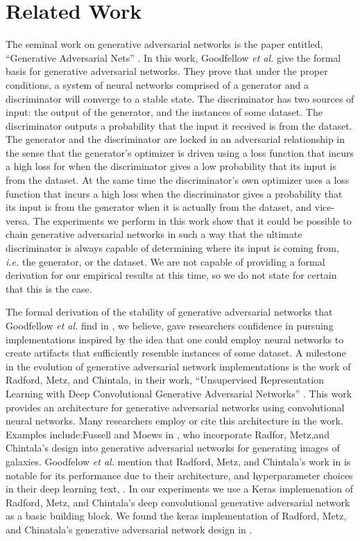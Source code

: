 \documentclass[conference]{IEEEtran}
\begin{document}
\section{Related Work}

The seminal work on generative adversarial networks is the paper entitled, 
``Generative Adversarial Nets'' \cite{gan}.  In this work, Goodfellow \textit{et
al.} give the formal basis for generative adversarial networks. They prove
that under the proper conditions, a system of neural networks comprised of a 
generator and a discriminator will converge to a stable state.  The
discriminator has two sources of input: the output of the generator, and the
instances of some dataset.  The discriminator outputs a probability that the
input it received is from the dataset.  The generator
and the discriminator are locked in an adversarial relationship in the sense
that the generator's optimizer is driven using a loss function that incurs a
high loss for when the discriminator gives a low probability that its input is
from the dataset.  At the same time the discriminator's own optimizer uses a
loss function that incurs a high loss when the discriminator gives a probability 
that its input is from the generator when it is actually from the dataset, and
vice-versa.  The experiments we perform in this work show that it could be
possible to chain generative adversarial networks in such a way that the
ultimate discriminator is always capable of determining where its input is
coming from, \textit{i.e.} the generator, or the dataset.  We are not capable of
providing a formal derivation for our empirical results at this time, so we do
not state for certain that this is the case.

The formal derivation of the stability of generative adversarial networks that
Goodfellow \textit{et al.} find in \cite{gan}, we believe, gave researchers
confidence in pursuing implementations inspired by the idea that one could
employ neural networks to create artifacts that sufficiently resemble instances
of some dataset.  A milestone in the evolution of generative adversarial network
implementations is the work of Radford, Metz, and Chintala, in their work, 
``Unsupervised Representation Learning with Deep Convolutional Generative
Adversarial Networks'' \cite{repLearnDcgan}.  This work provides an architecture for
generative adversarial networks using convolutional neural networks.  Many
researchers employ or cite this architecture in the work.  Examples
include:Fussell and Moews in \cite{galaxy}, who incorporate Radfor, Metz,and 
Chintala's design into generative adversarial networks for generating images of
galaxies.   Goodfelow \textit{et al.} mention that Radford, Metz, and Chintala's 
work in \cite{repLearnDcgan} is notable for its performance due to their architecture,
and hyperparameter choices in their deep learning text,
\cite{deepLearnBookGenCh}.  In our experiments we use a Keras implemenation of
Radford, Metz, and Chintala's deep convolutional generative adversarial 
network as a basic building block.   We found the keras implementation of 
Radford, Metz, and Chinatala's generative adversarial network design in
\cite{kerasdcgan}.
\end{document}
